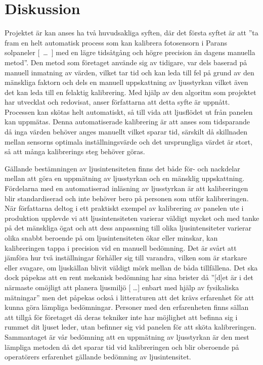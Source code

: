 \section{Diskussion} %
\label{sec:diskussion}

    Projektet är kan anses ha två huvudsakliga syften, där det första syftet är att ''ta fram en helt automatisk process som kan kalibrera fotosensorn i Parans solpaneler [~\dots~] med en lägre tidsåtgång och högre precision än dagens manuella metod''. 
    Den metod som företaget använde sig av tidigare, var dels baserad på manuell inmatning av värden, vilket tar tid och kan leda till fel på grund av den mänskliga faktorn och dels en manuell uppskattning av ljusstyrkan vilket även det kan leda till en felaktig kalibrering. 
    Med hjälp av den algoritm som projektet har utvecklat och redovisat, anser författarna att detta syfte är uppnått. Processen kan skötas helt automatiskt, så till vida att ljusflödet ut från panelen kan uppmätas. 
    Denna automatiserade kalibrering är att anses som tidsparande då inga värden behöver anges manuellt vilket sparar tid, särskilt då skillnaden mellan sensorns optimala inställningsvärde och det ursprungliga värdet är stort, så att många kalibrerings steg behöver göras. \bigskip

    Gällande bestämningen av ljusintensiteten finns det både för- och nackdelar mellan att göra en uppmätning av ljusstyrkan och en mänsklig uppskattning. Fördelarna med en automatiserad inläsning av ljusstyrkan är att kalibreringen blir standardiserad och inte behöver bero på personen som utför kalibreringen. När författarna deltog i ett praktiskt exempel av kalibrering av panelen ute i produktion upplevde vi att ljusintensiteten varierar väldigt mycket och med tanke på det mänskliga ögat och att dess anpassning till olika ljusintensiteter varierar olika snabbt beroende på om ljusintensiteten ökar eller minskar, kan kalibreringen tappa i precision vid en manuell bedömning.\cite[s.~273]{aot}  Det är svårt att jämföra hur två inställningar förhåller sig till varandra, vilken som är starkare eller svagare, om ljuskällan blivit väldigt mörk mellan de båda tillfällena. Det ska dock påpekas att en rent mekanisk bedömning har sina brister då ''[d]et är i det närmaste omöjligt att planera ljusmiljö [ \dots ] enbart med hjälp av fysikaliska mätningar'' men det påpekas också i litteraturen att det krävs erfarenhet för att kunna göra lämpliga bedömningar. \cite[s.~278]{aot} Personer med den erfarenheten finns sällan att tillgå för företaget då deras tekniker inte har möjlighet att befinna sig i rummet dit ljuset leder, utan befinner sig vid panelen för att sköta kalibreringen. Sammantaget är vår bedömning att en uppmätning av ljusstyrkan är den mest lämpliga metoden då det sparar tid vid kalibreringen och blir oberoende på operatörers erfarenhet gällande bedömning av ljusintensitet.


